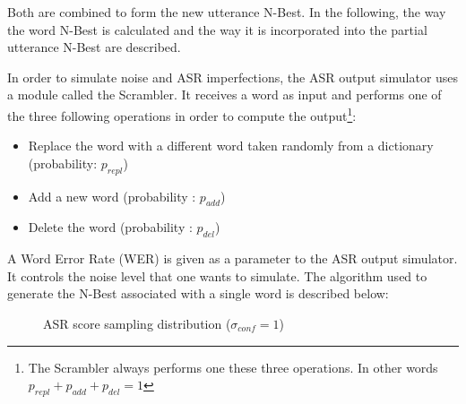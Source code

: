 					Both are combined to form the new utterance N-Best. In the following, the way the word N-Best is calculated and the way it is incorporated into the partial utterance N-Best are described.
					
					In order to simulate noise and ASR imperfections, the ASR output simulator uses a module called the Scrambler. It receives a word as input and performs one of the three following operations in order to compute the output\footnote{The Scrambler always performs one these three operations. In other words $p_{repl} + p_{add} + p_{del} = 1$}:
					
					\begin{itemize}
						\item Replace the word with a different word taken randomly from a dictionary (probability: $p_{repl}$)
						\item Add a new word (probability : $p_{add}$)
						\item Delete the word (probability : $p_{del}$)
					\end{itemize}
					
					A Word Error Rate (WER) is given as a parameter to the ASR output simulator. It controls the noise level that one wants to simulate. The algorithm used to generate the N-Best associated with a single word is described below:
					
					\begin{figure}[t]
					\centering
					\caption{ASR score sampling distribution ($\sigma_{conf} = 1$)}
					\label{fig:scoresample}
			\end{figure}
			
